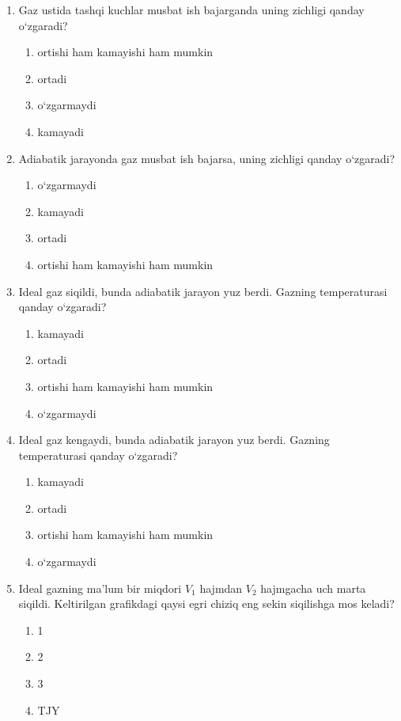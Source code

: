 \begin{enumerate}
\item Gaz ustida tashqi kuchlar musbat ish bajarganda uning zichligi qanday o‘zgaradi?
\begin{enumerate}[label=\Alph*)]
\item ortishi ham kamayishi ham mumkin
\item ortadi
\item o‘zgarmaydi
\item kamayadi
\end{enumerate}

\item Adiabatik jarayonda gaz musbat ish bajarsa, uning zichligi qanday o‘zgaradi?
\begin{enumerate}[label=\Alph*)]
\item o‘zgarmaydi
\item kamayadi
\item ortadi
\item ortishi ham kamayishi ham mumkin
\end{enumerate}

\item Ideal gaz siqildi, bunda adiabatik jarayon yuz berdi. Gazning temperaturasi qanday o‘zgaradi?
\begin{enumerate}[label=\Alph*)]
\item kamayadi
\item ortadi
\item ortishi ham kamayishi ham mumkin
\item o‘zgarmaydi
\end{enumerate}

\item Ideal gaz kengaydi, bunda adiabatik jarayon yuz berdi. Gazning temperaturasi qanday o‘zgaradi?
\begin{enumerate}[label=\Alph*)]
\item kamayadi
\item ortadi
\item ortishi ham kamayishi ham mumkin
\item o‘zgarmaydi
\end{enumerate}

\item Ideal gazning ma'lum bir miqdori $V_1$ hajmdan $V_2$ hajmgacha uch marta siqildi. Keltirilgan grafikdagi qaysi egri chiziq eng sekin siqilishga mos keladi?
\begin{enumerate}[label=\Alph*)]
\item 1
\item 2
\item 3
\item TJY
\end{enumerate}


\end{enumerate}
